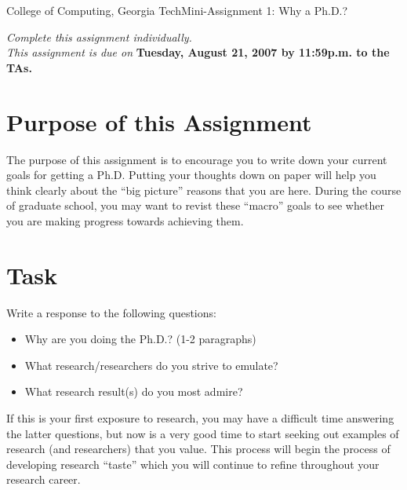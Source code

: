 \documentclass[11pt]{article}
\begin{document}


{College of Computing, Georgia Tech}{Mini-Assignment 1: Why a Ph.D.?}

{\em Complete this assignment individually. \\  This
  assignment is due on} {\bf Tuesday, August 21, 2007 by 11:59p.m. to
  the TAs.}

\section{Purpose of this Assignment}

The purpose of this assignment is to encourage you to write down your
current goals for getting a Ph.D.  Putting your thoughts down on paper
will help you think clearly about the ``big picture'' reasons that you
are here.  During the course of graduate school, you may want to revist
these ``macro'' goals to see whether you are making progress towards
achieving them.

\section{Task}

Write a response to the following questions:
\begin{itemize}
\itemsep=-1pt
    \item Why are you doing the Ph.D.? (1-2 paragraphs)
    \item What research/researchers do you strive to emulate?
    \item What research result(s) do you most admire?
\end{itemize}
\noindent
If this is your first exposure to research, you may have a difficult
time answering the latter questions, but now is a very good time to
start seeking out examples of research (and researchers) that you
value.  This process will begin the process of developing
research ``taste'' which you will continue to refine throughout your
research career.
\end{document}
